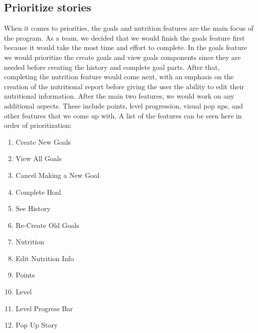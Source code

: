 \documentclass[a4paper]{article}
\begin{document}
\subsection{Prioritize stories}
When it comes to priorities, the goals and nutrition features are the main focus of the program.  As a team, we decided that we would finish the goals feature first because it would take the most time and effort to complete. In the goals feature we would prioritize the create goals and view goals components since they are needed before creating the history and complete goal parts.  After that, completing the nutrition feature would come next, with an emphasis on the creation of the nutritional report before giving the user the ability to edit their nutritional information.  After the main two features, we would work on any additional aspects.  These include points, level progression, visual pop ups, and other features that we come up with.
\newline
\newline
A list of the features can be seen here in order of prioritization:
\begin{enumerate}
\item Create New Goals
\item View All Goals
\item Cancel Making a New Goal
\item Complete Hoal
\item See History
\item Re-Create Old Goals
\item Nutrition
\item Edit Nutrition Info
\item Points
\item Level
\item Level Progress Bar
\item Pop Up Story
\end{enumerate}
\end{document}
